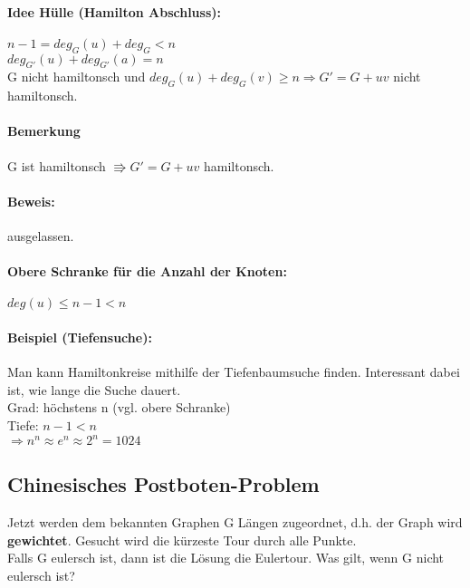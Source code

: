 

\paragraph{Idee Hülle (Hamilton Abschluss):} 
$n-1 = deg_G(u)+deg_G < n$\\
$deg_{G'}(u)+deg_{G'}(a)=n$\\
G nicht hamiltonsch und $deg_{G}(u)+deg_{G}(v) \geq n \Rightarrow G'=G+uv$ nicht hamiltonsch.

\paragraph{Bemerkung} G ist hamiltonsch $\Rrightarrow G'=G+uv$ hamiltonsch.

\paragraph{Beweis:} ausgelassen. 

\paragraph{Obere Schranke für die Anzahl der Knoten:} $deg(u) \leq n-1 < n$

\paragraph{Beispiel (Tiefensuche):} Man kann Hamiltonkreise mithilfe der Tiefenbaumsuche finden. Interessant dabei ist, wie lange die Suche dauert.\\
Grad: höchstens n (vgl. obere Schranke)\\
Tiefe: $n-1 < n$\\
$\Rightarrow n^n \approx e^n \approx 2^n = 1024$\\




\subsection{Chinesisches Postboten-Problem} Jetzt werden dem bekannten Graphen G Längen zugeordnet, d.h. der Graph wird \textbf{gewichtet}. Gesucht wird die kürzeste Tour durch alle Punkte. \\
Falls G eulersch ist, dann ist die Lösung die Eulertour. Was gilt, wenn G nicht eulersch ist? 

